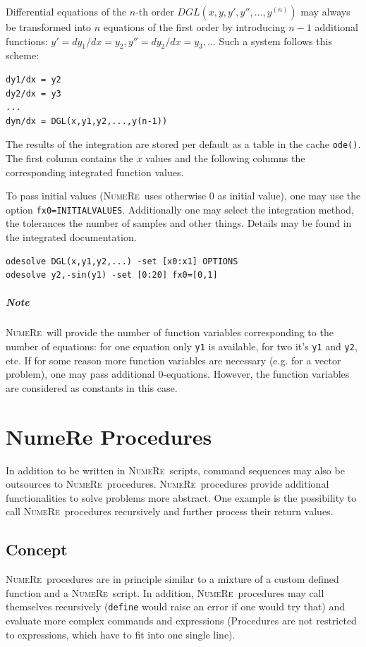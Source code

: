\documentclass[DIV=14,headsepline,footsepline]{scrbook}
\newcommand{\NR}{\textsc{Nu\-me\-Re}}
\begin{document}
				Differential equations of the $n$-th order $DGL(x,y,y',y'',\ldots,y^{(n)})$ may always be transformed into $n$ equations of the first order by introducing $n-1$ additional functions: $y' = dy_1/dx = y_2, y'' = dy_2/dx = y_3, \ldots$ Such a system follows this scheme:
				\begin{lstlisting}
dy1/dx = y2
dy2/dx = y3
...
dyn/dx = DGL(x,y1,y2,...,y(n-1))
				\end{lstlisting}
	
				The results of the integration are stored per default as a table in the cache \lstinline+ode()+. The first column contains the $x$ values and the following columns the corresponding integrated function values.
				
				To pass initial values (\NR\ uses otherwise 0 as initial value), one may use the option \lstinline+fx0=INITIALVALUES+. Additionally one may select the integration method, the tolerances the number of samples and other things. Details may be found in the integrated documentation.
				\begin{lstlisting}
odesolve DGL(x,y1,y2,...) -set [x0:x1] OPTIONS
odesolve y2,-sin(y1) -set [0:20] fx0=[0,1]
				\end{lstlisting}
				\paragraph{Note} \NR\ will provide the number of function variables corresponding to the number of equations: for one equation only \lstinline+y1+ is available, for two it's \lstinline+y1+ and \lstinline+y2+, etc. If for some reason more function variables are necessary (e.g. for a vector problem), one may pass additional 0-equations. However, the function variables are considered as constants in this case.
				
		\chapter{NumeRe Procedures}
			In addition to be written in \NR\ scripts, command sequences may also be outsources to \NR\ procedures. \NR\ procedures provide additional functionalities to solve problems more abstract. One example is the possibility to call \NR\ procedures recursively and further process their return values.
			\section{Concept}
				\NR\ procedures are in principle similar to a mixture of a custom defined function and a \NR\ script. In addition, \NR\ procedures may call themselves recursively (\lstinline+define+ would raise an error if one would try that) and evaluate more complex commands and expressions (Procedures are not restricted to expressions, which have to fit into one single line).
				
\end{document}

